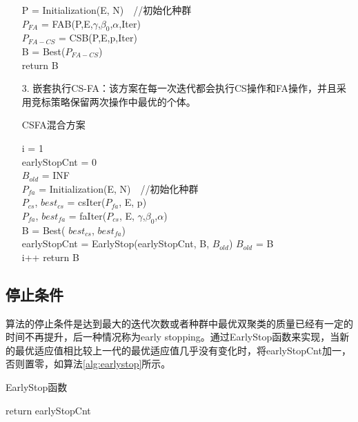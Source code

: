 \begin{enumerate}
\begin{algorithm}[htbp]
        P = Initialization(E, N)　//初始化种群 \\
        $P_{FA}$ = FAB(P,E,$\gamma$,$\beta_0$,$\alpha$,Iter) \\
        $P_{FA-CS}$ = CSB(P,E,p,Iter) \\
        B = Best($P_{FA-CS}$) \\
        return B \\
        \end{algorithm}
       \item[3.] 嵌套执行CS-FA：该方案在每一次迭代都会执行CS操作和FA操作，并且采用竞标策略保留两次操作中最优的个体。
        \begin{algorithm}[htbp]
        \caption{CSFA混合方案}\label{alg:csfa}
        i = 1 \\
        earlyStopCnt = 0 \\
        $B_{old}$ = INF \\
        $P_{fa}$ = Initialization(E, N)　//初始化种群 \\
        {
            $P_{cs}$, $best_{cs}$ = csIter($P_{fa}$, E, p) \\
            $P_{fa}$, $best_{fa}$ = faIter($P_{cs}$, E, $\gamma$,$\beta_0$,$\alpha$) \\
            B = Best( $best_{cs}$, $best_{fa}$) \\
            earlyStopCnt = EarlyStop(earlyStopCnt, B, $B_{old}$)
            $B_{old}$ = B \\
            i++
        }
        return B
        \end{algorithm}
    \end{enumerate}
    \subsection{停止条件}
    算法的停止条件是达到最大的迭代次数或者种群中最优双聚类的质量已经有一定的时间不再提升，后一种情况称为early stopping。通过EarlyStop函数来实现，当新的最优适应值相比较上一代的最优适应值几乎没有变化时，将earlyStopCnt加一，否则置零，如算法\ref{alg:earlystop}所示。
    \begin{algorithm}[htbp]
    \caption{EarlyStop函数}\label{alg:earlystop}
    \SetAlgoLined
        return earlyStopCnt 
    \end{algorithm}

